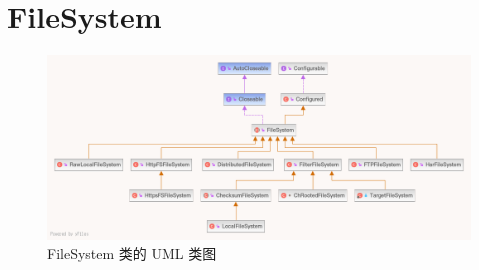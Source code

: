 \section{FileSystem}
    \begin{figure}[h]
        \centering
        \includegraphics[width=1\linewidth]{filesystemclass}
        \caption{FileSystem 类的 UML 类图}
        \label{fig:filesystemclass}
    \end{figure}
